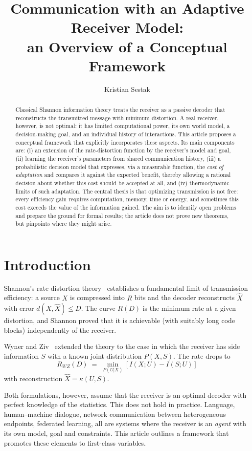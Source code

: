 \documentclass[11pt,a4paper]{article}
\title{Communication with an Adaptive Receiver Model:\\
an Overview of a Conceptual Framework}
\author{Kristian Sestak}
\date{}
\begin{document}
\maketitle

\begin{abstract}
\noindent
Classical Shannon information theory treats the receiver as a passive
decoder that reconstructs the transmitted message with minimum
distortion. A real receiver, however, is not optimal: it has limited
computational power, its own world model, a decision-making goal, and
an individual history of interactions. This article proposes a
conceptual framework that explicitly incorporates these aspects. Its
main components are: (i) an extension of the rate-distortion function
by the receiver's model and goal, (ii) learning the receiver's
parameters from shared communication history, (iii) a probabilistic
decision model that expresses, via a measurable function, the
\emph{cost of adaptation} and compares it against the expected
benefit, thereby allowing a rational decision about whether this cost
should be accepted at all, and (iv) thermodynamic limits of such
adaptation.  The central thesis is that optimizing transmission is
not free: every efficiency gain requires computation, memory, time or
energy, and sometimes this cost exceeds the value of the information
gained. The aim is to identify open problems and prepare the ground
for formal results; the article does not prove new theorems, but
pinpoints where they might arise.
\end{abstract}

\section{Introduction}

Shannon's rate-distortion theory~\cite{shannon1948,shannon1959}
establishes a fundamental limit of transmission efficiency: a source
$X$ is compressed into $R$ bits and the decoder reconstructs
$\hat{X}$ with error $d(X,\hat{X}) \le D$. The curve $R(D)$ is the
minimum rate at a given distortion, and Shannon proved that it is
achievable (with suitably long code blocks) independently of the
receiver.

Wyner and Ziv~\cite{wynerziv1976} extended the theory to the case in
which the receiver has side information $S$ with a known joint
distribution $P(X,S)$. The rate drops to
\[
    R_{WZ}(D) \;=\; \min_{P(U|X)} [I(X;U) - I(S;U)]
\]
with reconstruction $\hat{X} = \kappa(U,S)$.

Both formulations, however, assume that the receiver is an optimal
decoder with perfect knowledge of the statistics. This does not hold
in practice. Language, human--machine dialogue, network communication
between heterogeneous endpoints, federated learning, all are systems
where the receiver is an \emph{agent} with its own model, goal and
constraints. This article outlines a framework that promotes these
elements to first-class variables.
\end{document}
